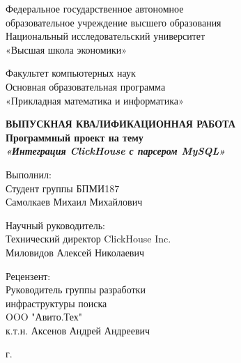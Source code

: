 \begin{titlepage}
\begin{center}

Федеральное государственное автономное\\
образовательное учреждение высшего образования\\
Национальный исследовательский университет\\
«Высшая школа экономики»

\vspace{10mm}
Факультет компьютерных наук\\
Основная образовательная программа\\
«Прикладная математика и информатика»

\vspace{20mm}

\textbf{\large ВЫПУСКНАЯ КВАЛИФИКАЦИОННАЯ РАБОТА}\\[3mm]

\textbf{\large Программный проект на тему}\\
\textbf{\textit{\large «Интеграция ClickHouse с парсером MySQL»}}

\vspace{20mm}

\begin{flushleft}
\begin{minipage}[t]{0.65\textwidth}
{Выполнил:} \\
Студент группы БПМИ187 \\
Самолкаев Михаил Михайлович
\vspace{10mm}

{Научный руководитель:} \\
Технический директор ClickHouse Inc.\\
Миловидов Алексей Николаевич
\vspace{10mm}

{Рецензент:} \\
Руководитель группы разработки\\
инфраструктуры поиска\\
OOO "Авито.Тех"\\
к.т.н. Аксенов Андрей Андреевич
\end{minipage}
\end{flushleft}

\vfill 

\par{\the\year{} г.}
\end{center}
\end{titlepage}
\restoregeometry
\addtocounter{page}{1}
